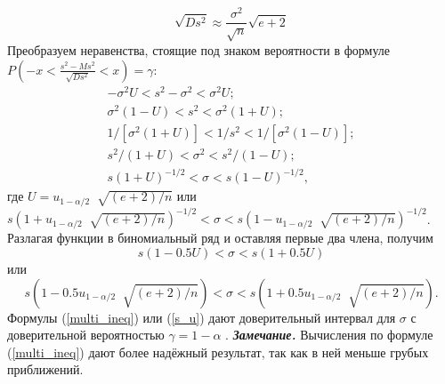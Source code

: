 \documentclass[../body.tex]{subfiles}
\begin{document}
\begin{equation}
	\sqrt{Ds^{2}} \approx \frac{\sigma^{2}}{\sqrt{n}}\sqrt{e + 2}
	\label{sqrt_Ds}
\end{equation}
Преобразуем неравенства, стоящие под знаком вероятности в формуле
\newline
$P\left(-x < \frac{s^{2}-Ms^{2}}{\sqrt{Ds^{2}}} < x\right) = \gamma$:
\begin{equation}
	\begin{split}
		-\sigma^{2}U < s^{2} -\sigma^{2} < \sigma^{2}U; \\
		\sigma^{2}(1-U) < s^{2} < \sigma^{2}(1 + U); \\
		1/[\sigma^{2}(1 + U)] < 1/s^{2} < 1/[\sigma^{2}(1-U)];\\
		s^{2}/(1 + U) < \sigma^{2} < s^{2}/(1-U);\\
		s(1 + U)^{-1/2} < \sigma < s(1-U)^{-1/2},
		\label{multi_ineq}
	\end{split}
\end{equation}
где $U = u_{1-\alpha/2}︀\sqrt{(e + 2)/n}$ или
\newline
$s(1 +  u_{1-\alpha/2}︀\sqrt{(e + 2)/n})^{-1/2} <\sigma < s(1-u_{1-\alpha/2}︀\sqrt{(e + 2)/n})^{-1/2}$.
\newline
Разлагая функции в биномиальный ряд и оставляя первые два члена, получим
\begin{equation}
	s(1-0.5U) < \sigma < s(1 + 0.5U)
	\label{s_U}
\end{equation}
или
\begin{equation}
	s(1-0.5u_{1-\alpha/2}︀\sqrt{(e + 2)/n}) < \sigma < s(1 + 0.5 u_{1-\alpha/2}︀\sqrt{(e + 2)/n}).
	\label{s_u}
\end{equation}
Формулы (\ref{multi_ineq}) или (\ref{s_u}) дают доверительный интервал для $\sigma$ с доверительной вероятностью $\gamma = 1-\alpha$ \cite[c.~461-462]{max}. 
\newline
\textbf{\textit{Замечание.}} Вычисления по формуле (\ref{multi_ineq}) дают более надёжный результат, так как в ней меньше грубых приближений.


		
		
\end{document}
